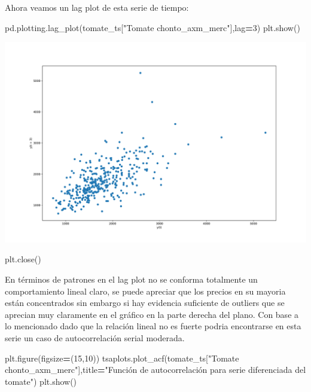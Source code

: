 \documentclass[
]{book}
\newenvironment{Shaded}{\begin{snugshade}}{\end{snugshade}}
\newcommand{\DecValTok}[1]{\textcolor[rgb]{0.00,0.00,0.81}{#1}}
\newcommand{\NormalTok}[1]{#1}
\newcommand{\OperatorTok}[1]{\textcolor[rgb]{0.81,0.36,0.00}{\textbf{#1}}}
\newcommand{\StringTok}[1]{\textcolor[rgb]{0.31,0.60,0.02}{#1}}
\begin{document}
Ahora veamos un lag plot de esta serie de tiempo:

\begin{Shaded}
\begin{Highlighting}[]

\NormalTok{pd.plotting.lag\_plot(tomate\_ts[}\StringTok{"Tomate chonto\_axm\_merc"}\NormalTok{],lag}\OperatorTok{=}\DecValTok{3}\NormalTok{)}
\NormalTok{plt.show()}
\end{Highlighting}
\end{Shaded}

\includegraphics{bookdown-demo_files/figure-latex/unnamed-chunk-76-45.pdf}

\begin{Shaded}
\begin{Highlighting}[]
\NormalTok{plt.close()}
\end{Highlighting}
\end{Shaded}

En términos de patrones en el lag plot no se conforma totalmente un comportamiento lineal claro, se puede apreciar que los precios en su mayoria están concentrados sin embargo si hay evidencia suficiente de outliers que se aprecian muy claramente en el gráfico en la parte derecha del plano. Con base a lo mencionado dado que la relación lineal no es fuerte podria encontrarse en esta serie un caso de autocorrelación serial moderada.

\begin{Shaded}
\begin{Highlighting}[]

\NormalTok{plt.figure(figsize}\OperatorTok{=}\NormalTok{(}\DecValTok{15}\NormalTok{,}\DecValTok{10}\NormalTok{))}
\NormalTok{tsaplots.plot\_acf(tomate\_ts[}\StringTok{"Tomate chonto\_axm\_merc"}\NormalTok{],title}\OperatorTok{=}\StringTok{"Función de autocorrelación para serie diferenciada del tomate"}\NormalTok{)}
\NormalTok{plt.show()}
\end{Highlighting}
\end{Shaded}
\end{document}
